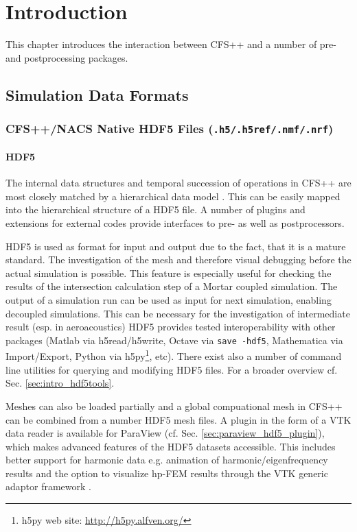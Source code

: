 \chapter{Introduction} 

This chapter introduces the interaction between CFS++ and a number of pre- and
postprocessing packages.

\section{Simulation Data Formats}

\subsection{CFS++/NACS Native HDF5 Files ({\tt .h5/.h5ref/.nmf/.nrf})}

\subsubsection{HDF5} The  internal data structures and  temporal succession of
operations  in CFS++ are  most closely  matched by  a hierarchical  data model
\cite{West2011,  DataModelWiki}.    This  can   be  easily  mapped   into  the
hierarchical structure of a HDF5 file.  A number of plugins and extensions for
external codes provide  interfaces to pre- as well  as postprocessors.

 HDF5 is  used as format for  input and output due  to the fact, that  it is a
 mature standard. The investigation of the mesh and therefore visual debugging
 before the actual simulation is  possible.  This feature is especially useful
 for checking  the results of  the intersection  calculation step of  a Mortar
 coupled simulation.  The output of a simulation  run can be used as input for
 next simulation, enabling  decoupled simulations.  This can  be necessary for
 the  investigation  of  intermediate  result (esp.   in  aeroacoustics)  HDF5
 provides   tested   interoperability   with  other   packages   (Matlab   via
 h5read/h5write, Octave  via {\tt save -hdf5},  Mathematica via Import/Export,
 Python  via  h5py\footnote{h5py   web  site:  \url{http://h5py.alfven.org/}},
 etc). There  exist also a number  of command line utilities  for querying and
 modifying       HDF5      files.       For      a       broader      overview
 cf. Sec. \ref{sec:intro_hdf5tools}.

 Meshes can also  be loaded partially and a global  compuational mesh in CFS++
can be combined from a number HDF5 mesh  files.  A plugin in the form of a VTK
data       reader       is       available       for       ParaView       (cf.
Sec.  \ref{sec:paraview_hdf5_plugin}), which  makes advanced  features  of the
HDF5  datasets accessible.   This includes  better support  for  harmonic data
e.g. animation of harmonic/eigenfrequency  results and the option to visualize
hp-FEM results through the VTK generic adaptor framework \cite{Schroeder2005}.

